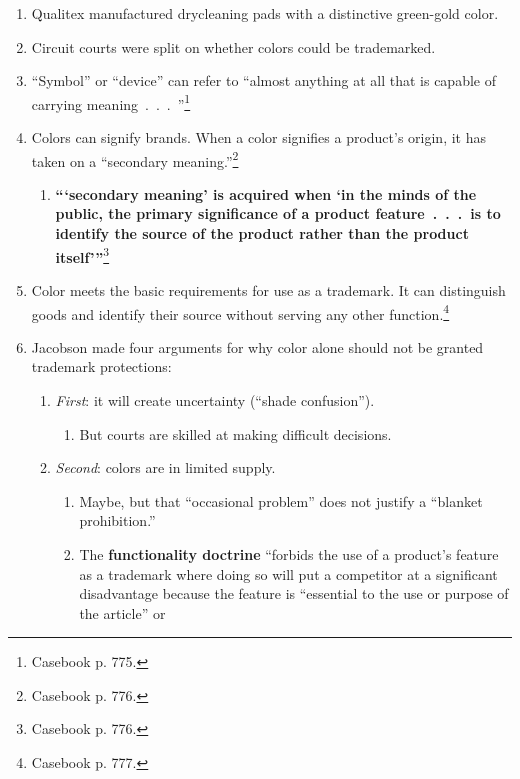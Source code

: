 \begin{enumerate}
    \item Qualitex manufactured drycleaning pads with a distinctive green-gold 
    color.
    \item Circuit courts were split on whether colors could be trademarked.
    \item ``Symbol'' or ``device'' can refer to ``almost anything at all that 
    is capable of carrying meaning~.~.~.~''\footnote{Casebook p. 775.}
    \item Colors can signify brands. When a color signifies a product's 
    origin, it has taken on a ``secondary meaning.''\footnote{Casebook p. 776.}
    \begin{enumerate}
        \item \textbf{\enquote{\enquote{secondary meaning} is acquired when 
        \enquote{in the minds of the public, the primary significance of a 
        product feature~.~.~.~is to identify the source of the product rather 
        than the product itself}}}\footnote{Casebook p. 776.}
    \end{enumerate}
    \item Color meets the basic requirements for use as a trademark. It 
    can distinguish goods and identify their source without serving any other 
    function.\footnote{Casebook p. 777.}
    \item Jacobson made four arguments for why color alone should not be 
    granted trademark protections:
    \begin{enumerate}
        \item \emph{First}: it will create uncertainty (``shade confusion'').
        \begin{enumerate}
            \item But courts are skilled at making difficult decisions.
        \end{enumerate}
        \item \emph{Second}: colors are in limited supply.
        \begin{enumerate}
            \item Maybe, but that ``occasional problem'' does not justify a 
            ``blanket prohibition.'' 
            \item The \textbf{functionality doctrine} ``forbids the use of a 
            product's feature as a trademark where doing so will put a 
            competitor at a significant disadvantage because the feature is 
            \enquote{essential to the use or purpose of the article} or 

\end{enumerate}
\end{enumerate}
\end{enumerate}
